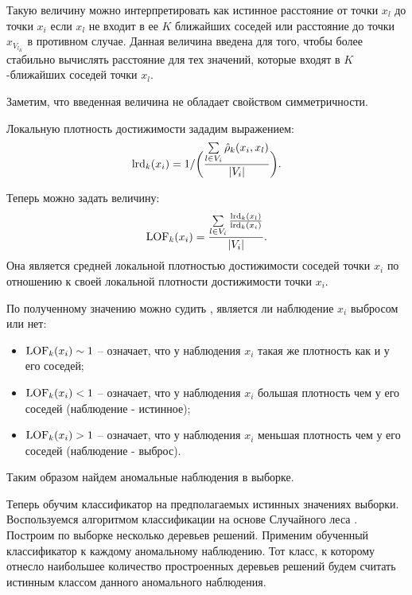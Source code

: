 Такую величину можно интерпретировать как истинное расстояние от точки $x_l$ до точки $x_i$ если $x_l$ не входит в ее $K$ ближайших соседей или расстояние до точки $x_{V_{l_K}}$ в противном случае. 
Данная величина введена для того, чтобы более стабильно вычислять расстояние для тех значений, которые входят в $K$-ближайших соседей точки $x_l$. 

Заметим, что введенная величина не обладает свойством симметричности.

Локальную плотность достижимости зададим выражением:
\begin{eqnarray}
    \textup{lrd}_k(x_i) = 1 / \bigg(\frac{\sum\limits_{l\in V_i}\hat{\rho}_k(x_i, x_l)}{|V_i|}\bigg).
\end{eqnarray}

Теперь можно задать величину:
\begin{eqnarray}
    \textup{LOF}_k(x_i) = \frac{\sum\limits_{l\in V_i}\frac{\textup{lrd}_k(x_l)}{\textup{lrd}_k(x_i)}}{|V_i|}.
\end{eqnarray}
Она является средней локальной плотностью достижимости соседей точки $x_i$ по отношению к своей локальной плотности достижимости точки $x_i$. 

По полученному значению можно судить \cite{LOF}, является ли наблюдение $x_i$ выбросом или нет:
\begin{itemize}
    \item $\textup{LOF}_k(x_i)\sim 1$   -- означает, что у наблюдения $x_i$ такая же плотность как и у его соседей;\\
    \item $\textup{LOF}_k(x_i)<1$  -- означает, что у наблюдения $x_i$ большая плотность чем у его соседей (наблюдение - истинное);\\
    \item $\textup{LOF}_k(x_i)>1$ -- означает, что у наблюдения $x_i$ меньшая плотность чем у его соседей (наблюдение - выброс).
\end{itemize}

Таким образом найдем аномальные наблюдения в выборке.

Теперь обучим классификатор на предполагаемых истинных значениях выборки. Воспользуемся алгоритмом классификации на основе Случайного леса \cite{RANDOM_FORESTS}. Построим по выборке несколько деревьев решений. 
Применим обученный классификатор к каждому аномальному наблюдению. Тот класс, к которому отнесло наибольшее количество простроенных деревьев решений будем считать истинным классом данного аномального наблюдения.


